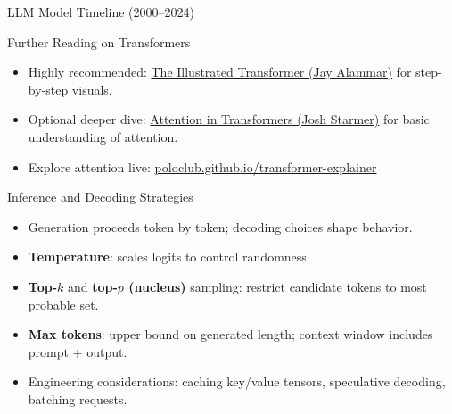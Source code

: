 \documentclass[aspectratio=169]{beamer}
\begin{document}
\begin{frame}{LLM Model Timeline (2000--2024)}
\end{frame}

\begin{frame}{Further Reading on Transformers}
  \begin{itemize}
    \item Highly recommended: \href{https://jalammar.github.io/illustrated-transformer/}{The Illustrated Transformer (Jay Alammar)} for step-by-step visuals.
    \item Optional deeper dive: \href{https://www.deeplearning.ai/short-courses/attention-in-transformers-concepts-and-code-in-pytorch/}{Attention in Transformers (Josh Starmer)} for basic understanding of attention.
    \item Explore attention live: \href{https://poloclub.github.io/transformer-explainer/}{poloclub.github.io/transformer-explainer}

  \end{itemize}
\end{frame}


\begin{frame}{Inference and Decoding Strategies}
  \begin{itemize}
    \item Generation proceeds token by token; decoding choices shape behavior.
    \item \textbf{Temperature}: scales logits to control randomness.
    \item \textbf{Top-$k$} and \textbf{top-$p$ (nucleus)} sampling: restrict candidate tokens to most probable set.
    \item \textbf{Max tokens}: upper bound on generated length; context window includes prompt + output.
    \item Engineering considerations: caching key/value tensors, speculative decoding, batching requests.
  \end{itemize}
\end{frame}
\end{document}
